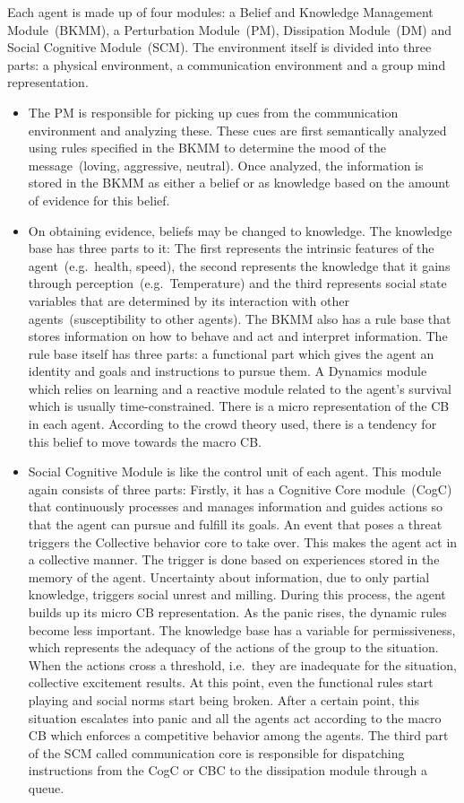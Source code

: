 Each agent is made up of four modules: a Belief and Knowledge Management Module~(BKMM), a Perturbation Module~(PM), Dissipation Module~(DM) and Social Cognitive Module~(SCM). The environment itself is divided into three parts: a physical environment, a communication environment and a group mind representation.
\begin{itemize}
\item
The PM is responsible for picking up cues from the communication environment and analyzing these. These cues are first semantically analyzed using rules specified in the BKMM to determine the mood of the message~(loving, aggressive, neutral). Once analyzed, the information is stored in the BKMM as either a belief or as knowledge based on the amount of evidence for this belief.
\item
On obtaining evidence, beliefs may be changed to knowledge. The knowledge base has three parts to it: The first represents the intrinsic features of the agent~(e.g.\ health, speed), the second represents the knowledge that it gains through perception~(e.g.\ Temperature) and the third represents social state variables that are determined by its interaction with other agents~(susceptibility to other agents). The BKMM also has a rule base that stores information on how to behave and act and interpret information. The rule base itself has three parts: a functional part which gives the agent an identity and goals and instructions to pursue them. A Dynamics module which relies on learning and a reactive module related to the agent's survival which is usually time-constrained. There is a micro representation of the CB in each agent. According to the crowd theory used, there is a tendency for this belief to move towards the macro CB.
\item
Social Cognitive Module is like the control unit of each agent. This module again consists of three parts: Firstly, it has a Cognitive Core module~(CogC) that continuously processes and manages information and guides actions so that the agent can pursue and fulfill its goals. An event that poses a threat triggers the Collective behavior core to take over. This makes the agent act in a collective manner. The trigger is done based on experiences stored in the memory of the agent. Uncertainty about information, due to only partial knowledge, triggers social unrest and milling. During this process, the agent builds up its micro CB representation. As the panic rises, the dynamic rules become less important. The knowledge base has a variable for permissiveness, which represents the adequacy of the actions of the group to the situation. When the actions cross a threshold, i.e.\ they are inadequate for the situation, collective excitement results. At this point, even the functional rules start playing and social norms start being broken. After a certain point, this situation escalates into panic and all the agents act according to the macro CB which enforces a competitive behavior among the agents. The third part of the SCM called communication core is responsible for dispatching instructions from the CogC or CBC to the dissipation module through a queue.

\end{itemize}
